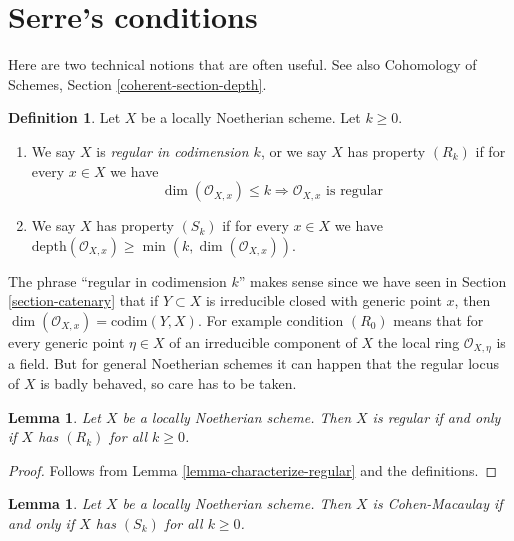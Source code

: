 \documentclass{stacks-project}
\theoremstyle{plain}
\newtheorem{lemma}[subsection]{Lemma}
\theoremstyle{definition}
\newtheorem{definition}[subsection]{Definition}
\theoremstyle{remark}
\numberwithin{equation}{subsection}
\begin{document}
\section{Serre's conditions}
\label{section-Rk}

\noindent
Here are two technical notions that are often useful.
See also Cohomology of Schemes, Section \ref{coherent-section-depth}.

\begin{definition}
\label{definition-Rk}
Let $X$ be a locally Noetherian scheme. Let $k \geq 0$.
\begin{enumerate}
\item We say $X$ is {\it regular in codimension $k$},
or we say $X$ has property {\it $(R_k)$} if for every $x \in X$
we have
$$
\dim(\mathcal{O}_{X, x}) \leq k
\Rightarrow
\mathcal{O}_{X, x}\text{ is regular}
$$
\item We say $X$ has property {\it $(S_k)$} if for every $x \in X$ we have
$\text{depth}(\mathcal{O}_{X, x}) \geq \min(k, \dim(\mathcal{O}_{X, x}))$.
\end{enumerate}
\end{definition}

\noindent
The phrase ``regular in codimension $k$'' makes sense since we have seen
in Section \ref{section-catenary} that if $Y \subset X$ is irreducible
closed with generic point $x$, then
$\dim(\mathcal{O}_{X, x}) = \text{codim}(Y, X)$. For example condition
$(R_0)$ means that for every generic point $\eta \in X$ of an irreducible
component of $X$ the local ring $\mathcal{O}_{X, \eta}$ is a field.
But for general Noetherian schemes it can happen that the regular locus
of $X$ is badly behaved, so care has to be taken.

\begin{lemma}
\label{lemma-scheme-regular-iff-all-Rk}
Let $X$ be a locally Noetherian scheme.
Then $X$ is regular if and only if $X$ has $(R_k)$ for all $k \geq 0$.
\end{lemma}

\begin{proof}
Follows from Lemma \ref{lemma-characterize-regular} and the definitions.
\end{proof}

\begin{lemma}
\label{lemma-scheme-CM-iff-all-Sk}
Let $X$ be a locally Noetherian scheme.
Then $X$ is Cohen-Macaulay if and only if $X$ has $(S_k)$ for all $k \geq 0$.
\end{lemma}
\end{document}
